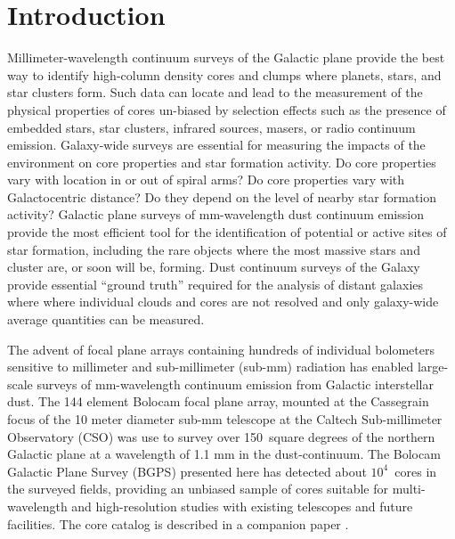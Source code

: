 \documentclass[12pt,preprint]{aastex}
\newcommand{\bgpsarea}{150}
\newcommand{\ncores}{$10^4$}
\begin{document}

%

\section{Introduction}

Millimeter-wavelength continuum surveys of the Galactic plane provide
the best way to identify high-column density cores and clumps where
planets, stars, and star clusters form.  Such data can locate and lead
to the measurement of the physical properties of cores un-biased by
selection effects such as the presence of embedded stars, star
clusters, infrared sources, masers, or radio continuum emission.
Galaxy-wide surveys are essential for measuring the impacts of the
environment on core properties and star formation activity.  Do core
properties vary with location in or out of spiral arms?  Do core
properties vary with Galactocentric distance?  Do they depend on the
level of nearby star formation activity?  Galactic plane surveys of
mm-wavelength dust continuum emission provide the most efficient tool
for the identification of potential or active sites of star formation,
including the rare objects where the most massive stars and cluster
are, or soon will be, forming.  Dust continuum surveys of the Galaxy
provide essential ``ground truth'' required for the analysis of distant
galaxies where where individual clouds and cores are not resolved and
only galaxy-wide average quantities can be measured.

The advent of focal plane arrays containing hundreds of individual
bolometers sensitive to millimeter and sub-millimeter (sub-mm)
radiation has enabled large-scale surveys of mm-wavelength continuum
emission from Galactic interstellar dust.  The 144 element Bolocam
focal plane array, mounted at the Cassegrain focus of the 10 meter
diameter sub-mm telescope at the Caltech Sub-millimeter Observatory
(CSO) was use to survey over \bgpsarea\ square degrees of the northern
Galactic plane at a wavelength of 1.1 mm in the dust-continuum.  The
Bolocam Galactic Plane Survey (BGPS) presented here has detected about
\ncores\ cores in the surveyed fields, providing an unbiased sample of
cores suitable for multi-wavelength and high-resolution studies with
existing telescopes and future facilities.  The core catalog is
described in a companion paper \citep{rosolowsky09}.
\end{document}
